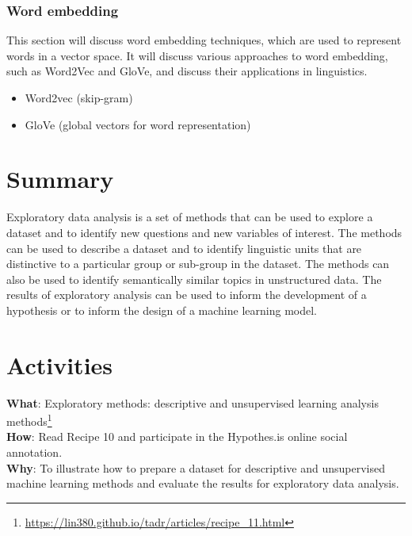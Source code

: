 \documentclass[
  letterpaper,
]{latex/krantz}
\providecommand{\tightlist}{%
  \setlength{\itemsep}{0pt}\setlength{\parskip}{0pt}}\usepackage{longtable,booktabs,array}
\DeclareRobustCommand{\href}[2]{#2\footnote{\url{#1}}}
\begin{document}
\hypertarget{eda-word-embedding}{%
\subsubsection{Word embedding}\label{eda-word-embedding}}

This section will discuss word embedding techniques, which are used to
represent words in a vector space. It will discuss various approaches to
word embedding, such as Word2Vec and GloVe, and discuss their
applications in linguistics.

\begin{itemize}
\tightlist
\item
  Word2vec (skip-gram)
\item
  GloVe (global vectors for word representation)
\end{itemize}

\hypertarget{summary-11}{%
\section{Summary}\label{summary-11}}

Exploratory data analysis is a set of methods that can be used to
explore a dataset and to identify new questions and new variables of
interest. The methods can be used to describe a dataset and to identify
linguistic units that are distinctive to a particular group or sub-group
in the dataset. The methods can also be used to identify semantically
similar topics in unstructured data. The results of exploratory analysis
can be used to inform the development of a hypothesis or to inform the
design of a machine learning model.

\hypertarget{activities-7}{%
\section*{Activities}\label{activities-7}}


\begin{tcolorbox}[enhanced jigsaw, colframe=quarto-callout-tip-color-frame, titlerule=0mm, coltitle=black, colback=white, opacitybacktitle=0.6, colbacktitle=quarto-callout-tip-color!10!white, left=2mm, arc=.35mm, leftrule=.75mm, rightrule=.15mm, bottomtitle=1mm, toptitle=1mm, breakable, bottomrule=.15mm, title=\textcolor{quarto-callout-tip-color}{\faLightbulb}\hspace{0.5em}{Recipe}, toprule=.15mm, opacityback=0]

\textbf{What}:
\href{https://lin380.github.io/tadr/articles/recipe_11.html}{Exploratory
methods: descriptive and unsupervised learning analysis methods}\\
\textbf{How}: Read Recipe 10 and participate in the Hypothes.is online
social annotation.\\
\textbf{Why}: To illustrate how to prepare a dataset for descriptive and
unsupervised machine learning methods and evaluate the results for
exploratory data analysis.

\end{tcolorbox}
\end{document}
